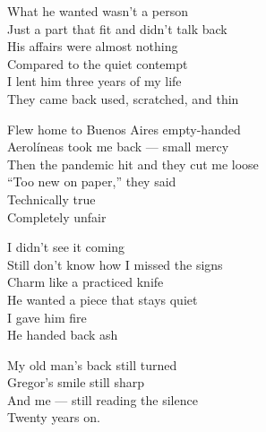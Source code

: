 \begin{lyrics}
What he wanted wasn’t a person\\
Just a part that fit and didn’t talk back\\
His affairs were almost nothing\\
Compared to the quiet contempt\\
I lent him three years of my life\\
They came back used, scratched, and thin

Flew home to Buenos Aires empty-handed\\
Aerolíneas took me back — small mercy\\
Then the pandemic hit and they cut me loose\\
“Too new on paper,” they said\\
Technically true\\
Completely unfair

I didn’t see it coming\\
Still don’t know how I missed the signs\\
Charm like a practiced knife\\
He wanted a piece that stays quiet\\
I gave him fire\\
He handed back ash

My old man’s back still turned\\
Gregor’s smile still sharp\\
And me — still reading the silence\\
Twenty years on.
\end{lyrics}


